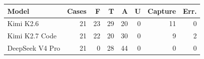 \begin{tabular}{lrrrrrrr}
\toprule
Model & Cases & F & T & A & U & Capture & Err. \\
\midrule
Kimi K2.6 & 21 & 23 & 29 & 20 & 0 & 11 & 0 \\
Kimi K2.7 Code & 21 & 22 & 20 & 30 & 0 & 9 & 2 \\
DeepSeek V4 Pro & 21 & 0 & 28 & 44 & 0 & 0 & 0 \\
\bottomrule
\end{tabular}
